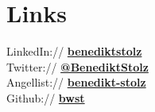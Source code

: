 \documentclass[]{deedy-resume-openfont}
\begin{document}
\begin{minipage}[t]{0.33\textwidth}

\section{Links} 
LinkedIn:// \href{https://www.linkedin.com/in/benediktstolz}{\bf benediktstolz} \\
Twitter:// \href{https://twitter.com/BenediktStolz}{\bf @BenediktStolz} \\
Angellist:// \href{https://angel.co/u/benedikt-stolz}{\bf benedikt-stolz}\\
Github:// \href{https://github.com/bwst}{\bf bwst} \\
\sectionsep

%
%

\end{minipage} 
\hfill
\end{document}
